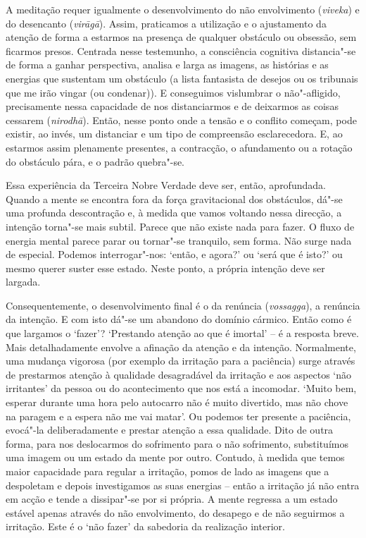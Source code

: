 A meditação requer igualmente o desenvolvimento do não envolvimento
(\emph{viveka}) e do desencanto (\emph{virāgā}). Assim, praticamos a utilização
e o ajustamento da atenção de forma a estarmos na presença de qualquer obstáculo
ou obsessão, sem ficarmos presos. Centrada nesse testemunho, a consciência
cognitiva distancia"-se de forma a ganhar perspectiva, analisa e larga as
imagens, as histórias e as energias que sustentam um obstáculo (a lista
fantasista de desejos ou os tribunais que me irão vingar (ou condenar)). E
conseguimos vislumbrar o não"-afligido, precisamente nessa capacidade de nos
distanciarmos e de deixarmos as coisas cessarem (\emph{nirodhā}). Então, nesse
ponto onde a tensão e o conflito começam, pode existir, ao invés, um distanciar
e um tipo de compreensão esclarecedora. E, ao estarmos assim plenamente
presentes, a contracção, o afundamento ou a rotação do obstáculo pára, e o
padrão quebra"-se.

Essa experiência da Terceira Nobre Verdade deve ser, então, aprofundada. Quando
a mente se encontra fora da força gravitacional dos obstáculos, dá"-se uma
profunda descontração e, à medida que vamos voltando nessa direcção, a intenção
torna"-se mais subtil. Parece que não existe nada para fazer. O fluxo de energia
mental parece parar ou tornar"-se tranquilo, sem forma. Não surge nada de
especial. Podemos interrogar"-nos: `então, e agora?' ou `será que é isto?' ou
mesmo querer suster esse estado. Neste ponto, a própria intenção deve ser
largada.

Consequentemente, o desenvolvimento final é o da renúncia (\emph{vossagga}), a
renúncia da intenção. E com isto dá"-se um abandono do domínio cármico. Então
como é que largamos o `fazer'? `Prestando atenção ao que é imortal' -- é a
resposta breve. Mais detalhadamente envolve a afinação da atenção e da intenção.
Normalmente, uma mudança vigorosa (por exemplo da irritação para a paciência)
surge através de prestarmos atenção à qualidade desagradável da irritação e aos
aspectos `não irritantes' da pessoa ou do acontecimento que nos está a
incomodar. `Muito bem, esperar durante uma hora pelo autocarro não é muito
divertido, mas não chove na paragem e a espera não me vai matar'. Ou podemos ter
presente a paciência, evocá"-la deliberadamente e prestar atenção a essa
qualidade. Dito de outra forma, para nos deslocarmos do sofrimento para o não
sofrimento, substituímos uma imagem ou um estado da mente por outro. Contudo, à
medida que temos maior capacidade para regular a irritação, pomos de lado as
imagens que a despoletam e depois investigamos as suas energias -- então a
irritação já não entra em acção e tende a dissipar"-se por si própria. A mente
regressa a um estado estável apenas através do não envolvimento, do desapego e
de não seguirmos a irritação. Este é o `não fazer' da sabedoria da realização
interior.

